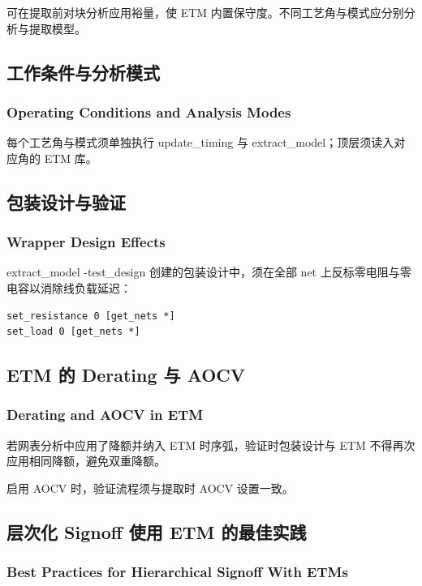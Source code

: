可在提取前对块分析应用裕量，使 ETM 内置保守度。不同工艺角与模式应分别分析与提取模型。

\subsection{工作条件与分析模式}
\subsubsection*{Operating Conditions and Analysis Modes}

\begin{noteBox}
每个工艺角与模式须单独执行 update_timing 与 extract_model；顶层须读入对应角的 ETM 库。
\end{noteBox}

\subsection{包装设计与验证}
\subsubsection*{Wrapper Design Effects}

extract_model -test_design 创建的包装设计中，须在全部 net 上反标零电阻与零电容以消除线负载延迟：
\begin{lstlisting}
set_resistance 0 [get_nets *]
set_load 0 [get_nets *]
\end{lstlisting}

\subsection{ETM 的 Derating 与 AOCV}
\subsubsection*{Derating and AOCV in ETM}

若网表分析中应用了降额并纳入 ETM 时序弧，验证时包装设计与 ETM 不得再次应用相同降额，避免双重降额。

启用 AOCV 时，验证流程须与提取时 AOCV 设置一致。

\subsection{层次化 Signoff 使用 ETM 的最佳实践}
\subsubsection*{Best Practices for Hierarchical Signoff With ETMs}


